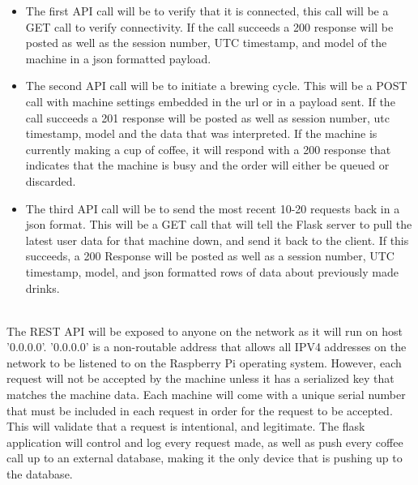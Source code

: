 \documentclass[conference]{IEEEtran}
\begin{document}
\begin{itemize}
\item The first API call will be to verify that it is connected, this call will
be a GET call to verify connectivity. If the call succeeds a 200 response will
be posted as well as the session number, UTC timestamp, and model of the
machine in a json formatted payload.
\item The second API call will be to initiate a brewing cycle. This will be a
POST call with machine settings embedded in the url or in a payload sent. If the
call succeeds a 201 response will be posted as well as session number, utc
timestamp, model and the data that was interpreted. If the machine is currently
making a cup of coffee, it will respond with a 200 response that indicates that
the machine is busy and the order will either be queued or discarded.
\item The third API call will be to send the most recent 10-20 requests back in
a json format. This will be a GET call that will tell the Flask server to pull
the latest user data for that machine down, and send it back to the client. If
this succeeds, a 200 Response will be posted as well as a session number, UTC
timestamp, model, and json formatted rows of data about previously made drinks.
\end{itemize}
\ \\

The REST API will be exposed to anyone on the network as it will run on host
'0.0.0.0'. '0.0.0.0' is a non-routable address that allows all IPV4 addresses
on the network to be listened to on the Raspberry Pi operating system.
However, each request will not be accepted by the machine unless it has a
serialized key that matches the machine data. Each machine will come with a
unique serial number that must be included in each request in order for the
request to be accepted. This will validate that a request is intentional, and
legitimate.
The flask application will control and log every request made, as well as push
every coffee call up to an external database, making it the only device that is
pushing up to the database.

\end{document}
